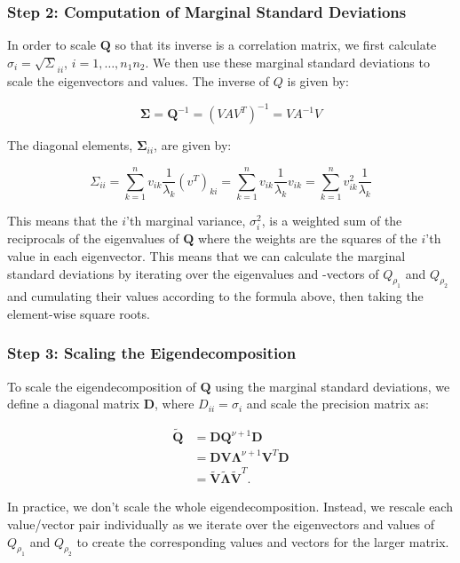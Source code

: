 \documentclass[journal=,manuscript=]{achemso}
\begin{document}
\subsubsection{Step 2: Computation of Marginal Standard
Deviations}\label{step-2-computation-of-marginal-standard-deviations}

In order to scale \(\mathbf Q\) so that its inverse is a correlation
matrix, we first calculate \(\sigma_i = \sqrt\Sigma_{ii}\),
\(i = 1, \dots, n_1n_2\). We then use these marginal standard deviations
to scale the eigenvectors and values. The inverse of \(Q\) is given by:

\[
\boldsymbol \Sigma = \mathbf Q^{-1} = (VAV^T)^{-1} = VA^{-1}V
\]

The diagonal elements, \(\boldsymbol \Sigma_{ii}\), are given by:

\[
\Sigma_{ii} = \sum_{k=1}^{n} v_{ik} \frac{1}{\lambda_k} (v^T)_{ki} = \sum_{k=1}^{n} v_{ik} \frac{1}{\lambda_k} v_{ik} = \sum_{k=1}^{n} v_{ik}^2 \frac{1}{\lambda_k}
\]

This means that the \(i\)'th marginal variance, \(\sigma_i^2\), is a
weighted sum of the reciprocals of the eigenvalues of \(\mathbf Q\)
where the weights are the squares of the \(i\)'th value in each
eigenvector. This means that we can calculate the marginal standard
deviations by iterating over the eigenvalues and -vectors of
\(Q_{\rho_1}\) and \(Q_{\rho_2}\) and cumulating their values according
to the formula above, then taking the element-wise square roots.

\subsubsection{Step 3: Scaling the
Eigendecomposition}\label{step-3-scaling-the-eigendecomposition}

To scale the eigendecomposition of \(\mathbf{Q}\) using the marginal
standard deviations, we define a diagonal matrix \(\mathbf{D}\), where
\(D_{ii} = \sigma_i\) and scale the precision matrix as:

\[
\begin{aligned}
\mathbf{\widetilde  Q} &= \mathbf{D}\mathbf{Q}^{\nu+1}\mathbf{D} \\
&= \mathbf{D}\mathbf{V}\mathbf{\Lambda}^{\nu+1}\mathbf{V}^T\mathbf{D} \\
&= \mathbf{\widetilde V}\mathbf{\widetilde\Lambda}\mathbf{\widetilde V}^T.
\end{aligned}
\]

In practice, we don't scale the whole eigendecomposition. Instead, we
rescale each value/vector pair individually as we iterate over the
eigenvectors and values of \(Q_{\rho_1}\) and \(Q_{\rho_2}\) to create
the corresponding values and vectors for the larger matrix.
\end{document}
